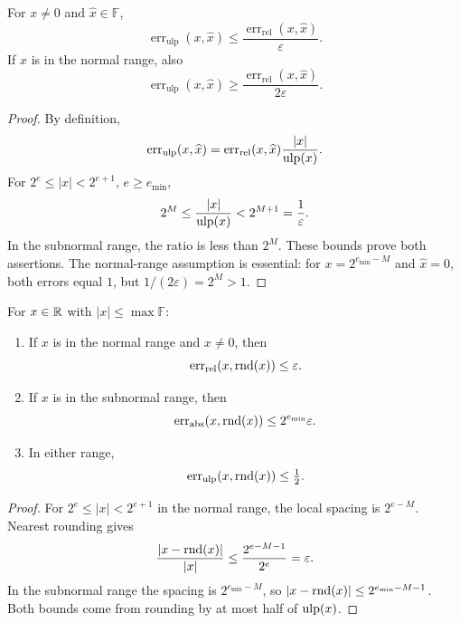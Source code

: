\begin{proposition}
For $x\ne0$ and $\widehat{x}\in\mathbb F$,
\[
 \operatorname{err}_{\mathrm{ulp}}(x, \widehat{x})
 \le\frac{\operatorname{err}_{\mathrm{rel}}(x, \widehat{x})}
 {\varepsilon}.
\]
If $x$ is in the normal range, also
\[
 \operatorname{err}_{\mathrm{ulp}}(x, \widehat{x})
 \ge\frac{\operatorname{err}_{\mathrm{rel}}(x, \widehat{x})}
 {2\varepsilon}.
\]
\end{proposition}
\begin{proof}
By definition,
\[
 \operatorname{err}_{\mathrm{ulp}}(x, \widehat{x})
 =\operatorname{err}_{\mathrm{rel}}(x, \widehat{x})
 \frac{|x|}{\operatorname{ulp}(x)}.
\]
For $2^e\le|x|<2^{e+1}$, $e\ge e_{\min}$,
\[
 2^M\le\frac{|x|}{\operatorname{ulp}(x)}<2^{M+1}=\frac1\varepsilon.
\]
In the subnormal range, the ratio is less than $2^M$.
These bounds prove both assertions. The normal-range assumption
is essential: for $x=2^{e_{\min}-M}$ and $\widehat{x}=0$,
both errors equal $1$, but $1/(2\varepsilon)=2^M>1$.
\end{proof}

\begin{proposition}
For $x\in\mathbb{R}$ with $|x|\le\max\mathbb F$:
\begin{enumerate}[label=(\roman*)]
 \item If $x$ is in the normal range and $x\ne0$, then
 \[
 \operatorname{err}_{\mathrm{rel}}(x, \operatorname{rnd}(x))\le\varepsilon.
 \]
 \item If $x$ is in the subnormal range, then
 \[
 \operatorname{err}_{\mathrm{abs}}(x, \operatorname{rnd}(x))
 \le2^{e_{\min}}\varepsilon.
 \]
 \item In either range,
 \[
 \operatorname{err}_{\mathrm{ulp}}(x, \operatorname{rnd}(x))\le\tfrac12.
 \]
\end{enumerate}
\end{proposition}
\begin{proof}
For $2^e\le|x|<2^{e+1}$ in the normal range,
the local spacing is $2^{e-M}$. Nearest rounding gives
\[
 \frac{|x-\operatorname{rnd}(x)|}{|x|}
 \le\frac{2^{e-M-1}}{2^e}=\varepsilon.
\]
In the subnormal range the spacing is $2^{e_{\min}-M}$,
so $|x-\operatorname{rnd}(x)|\le2^{e_{\min}-M-1}$.
Both bounds come from rounding by at most half of $\operatorname{ulp}(x)$.
\end{proof}

